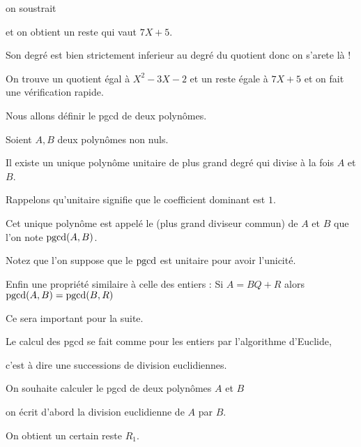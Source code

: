 \change

on soustrait
 
et on obtient un reste qui vaut $7X+5$.

Son degré est bien strictement inferieur au degré du quotient donc on s'arete là !

\change

On trouve un quotient égal à $X^2-3X-2$ et 
un reste égale à $7X+5$ et on fait une vérification rapide.



\diapo

Nous allons définir le pgcd de deux polynômes.

Soient  $A,B$ deux polynômes non nuls.

Il existe un unique polynôme unitaire de plus grand degré qui
divise à la fois $A$ et $B$.

Rappelons qu'unitaire signifie que le coefficient dominant est $1$.

\change

Cet unique polynôme est appelé le  
(plus grand diviseur commun) de $A$ et $B$ 
que l'on note $\mathop{\mathrm{pgcd}}\nolimits(A,B)$.

\change

Notez que l'on suppose que le $\mathop{\mathrm{pgcd}}\nolimits$ est unitaire pour avoir l'unicité.


% 
% 
% 
% 

\change

Enfin une propriété similaire à celle des entiers :
 Si $A=BQ+R$ alors $\mathop{\mathrm{pgcd}}\nolimits(A,B) = \mathop{\mathrm{pgcd}}\nolimits(B,R)$
 
 Ce sera important pour la suite.
 
 
\diapo

Le calcul des pgcd se fait comme pour les entiers par l'algorithme d'Euclide,

c'est à dire une successions de division euclidiennes.

\change

On souhaite calculer le pgcd de deux polynômes $A$ et $B$

on écrit d'abord la division euclidienne de $A$ par $B$.

On obtient un certain reste $R_1$.

\change

